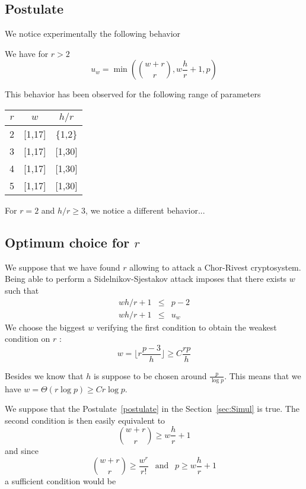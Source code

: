 \documentclass[a4paper]{article}
\begin{document}
\subsection{Postulate}

We notice experimentally the following behavior

\begin{postulate}
\label{postulate}
We have for $r > 2$
$$ u_w = \min \left( \binom{w+r}{r}, w\frac{h}{r} + 1 , p \right)$$
\end{postulate}

This behavior has been observed for the following range of parameters
\begin{center}
\begin{tabular}{|c|c|c|}
\hline
$r$ & $w$ 	& $h/r$ \\
\hline
2	& [1,17]	& \{1,2\}	\\
\hline
3	& [1,17]	& [1,30] \\
\hline
4	& [1,17]	& [1,30] \\
\hline
5	& [1,17]	& [1,30] \\
\hline
\end{tabular}
\end{center}


For $r = 2$ and $h/r \geq 3$, we notice a different behavior...


\subsection{Optimum choice for $r$}

We suppose that we have found $r$ allowing to attack a Chor-Rivest cryptosystem. Being able to perform a Sidelnikov-Sjestakov attack imposes that there exists $w$ such that
\begin{eqnarray*}
wh/r+1 &\leq & p-2 \\
wh/r+1 &\leq & u_w 
\end{eqnarray*}
We choose the biggest $w$ verifying the first condition to obtain the weakest condition on $r$ : $$ w = \lfloor r \frac{p-3}{h} \rfloor \geq C \frac{rp}{h} $$



Besides we know that $h$ is suppose to be chosen around $\frac{p}{\log p}$. This means that we have $w = \Theta(r \log p) \geq C r \log p$.

We suppose that the Postulate~\ref{postulate} in the Section~\ref{sec:Simul} is true. The second condition is then easily equivalent to
$$ \binom{w+r}{r} \geq w\frac{h}{r}+1 $$
and since
$$ \binom{w+r}{r} \geq \frac{w^r}{r!} \ \ \text{ and } \ \ p \geq w\frac{h}{r}+1 $$
a sufficient condition would be
\end{document}

